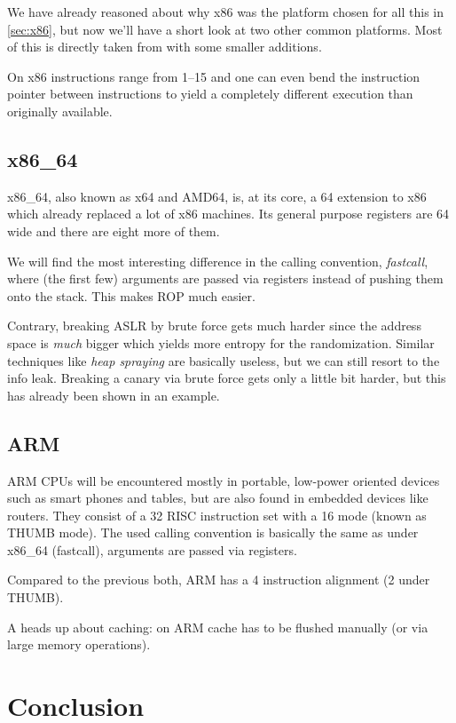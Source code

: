 \documentclass[article]{uibk}
\begin{document}
We have already reasoned about why x86 was the platform chosen for all this in
\cref{sec:x86}, but now we'll have a short look at two other common platforms.
Most of this is directly taken from \cite{rpisec} with some smaller additions.

On x86 instructions range from \SIrange{1}{15}{\byte} and one can even bend the
instruction pointer between instructions to yield a completely different
execution than originally available.

\subsection{x86\_64}

x86\_64, also known as x64 and AMD64, is, at its core, a \SI{64}{\bit}
extension to x86 which already replaced a lot of x86 machines. Its general
purpose registers are \SI{64}{\bit} wide and there are eight more of them.

We will find the most interesting difference in the calling convention,
\textit{fastcall}, where (the first few) arguments are passed via registers
instead of pushing them onto the stack. This makes ROP much easier.

Contrary, breaking ASLR by brute force gets much harder since the address space
is \emph{much} bigger which yields more entropy for the randomization. Similar
techniques like \textit{heap spraying} are basically useless, but we can still
resort to the info leak. Breaking a canary via brute force gets only a little
bit harder, but this has already been shown in an example.

\subsection{ARM}

ARM CPUs will be encountered mostly in portable, low-power oriented devices
such as smart phones and tables, but are also found in embedded devices like
routers. They consist of a \SI{32}{\bit} RISC instruction set with a
\SI{16}{\bit} mode (known as THUMB mode). The used calling convention is
basically the same as under x86\_64 (fastcall), arguments are passed via
registers.

Compared to the previous both, ARM has a \SI{4}{\byte} instruction alignment
(\SI{2}{\byte} under THUMB).

A heads up about caching: on ARM cache has to be flushed manually (or via large
memory operations).

\section{Conclusion}
\end{document}
